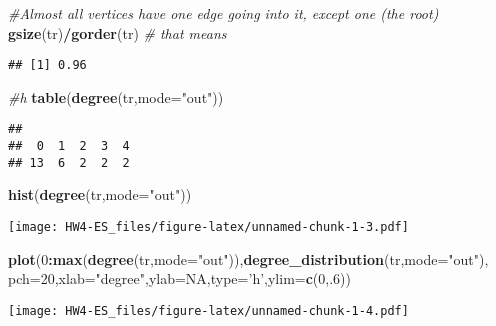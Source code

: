 \documentclass[
]{article}
\newenvironment{Shaded}{\begin{snugshade}}{\end{snugshade}}
\newcommand{\CommentTok}[1]{\textcolor[rgb]{0.56,0.35,0.01}{\textit{#1}}}
\newcommand{\DataTypeTok}[1]{\textcolor[rgb]{0.13,0.29,0.53}{#1}}
\newcommand{\DecValTok}[1]{\textcolor[rgb]{0.00,0.00,0.81}{#1}}
\newcommand{\KeywordTok}[1]{\textcolor[rgb]{0.13,0.29,0.53}{\textbf{#1}}}
\newcommand{\NormalTok}[1]{#1}
\newcommand{\OperatorTok}[1]{\textcolor[rgb]{0.81,0.36,0.00}{\textbf{#1}}}
\newcommand{\OtherTok}[1]{\textcolor[rgb]{0.56,0.35,0.01}{#1}}
\newcommand{\StringTok}[1]{\textcolor[rgb]{0.31,0.60,0.02}{#1}}
\begin{document}
\begin{Shaded}
\begin{Highlighting}[]
\CommentTok{#Almost all vertices have one edge going into it, except one (the root)}
\KeywordTok{gsize}\NormalTok{(tr)}\OperatorTok{/}\KeywordTok{gorder}\NormalTok{(tr) }\CommentTok{# that means}
\end{Highlighting}
\end{Shaded}

\begin{verbatim}
## [1] 0.96
\end{verbatim}

\begin{Shaded}
\begin{Highlighting}[]
\CommentTok{#h}
\KeywordTok{table}\NormalTok{(}\KeywordTok{degree}\NormalTok{(tr,}\DataTypeTok{mode=}\StringTok{"out"}\NormalTok{))}
\end{Highlighting}
\end{Shaded}

\begin{verbatim}
## 
##  0  1  2  3  4 
## 13  6  2  2  2
\end{verbatim}

\begin{Shaded}
\begin{Highlighting}[]
\KeywordTok{hist}\NormalTok{(}\KeywordTok{degree}\NormalTok{(tr,}\DataTypeTok{mode=}\StringTok{"out"}\NormalTok{))}
\end{Highlighting}
\end{Shaded}

\texttt{[image: HW4-ES\_files/figure-latex/unnamed-chunk-1-3.pdf]}

\begin{Shaded}
\begin{Highlighting}[]
\KeywordTok{plot}\NormalTok{(}\DecValTok{0}\OperatorTok{:}\KeywordTok{max}\NormalTok{(}\KeywordTok{degree}\NormalTok{(tr,}\DataTypeTok{mode=}\StringTok{"out"}\NormalTok{)),}\KeywordTok{degree_distribution}\NormalTok{(tr,}\DataTypeTok{mode=}\StringTok{"out"}\NormalTok{),}
     \DataTypeTok{pch=}\DecValTok{20}\NormalTok{,}\DataTypeTok{xlab=}\StringTok{"degree"}\NormalTok{,}\DataTypeTok{ylab=}\OtherTok{NA}\NormalTok{,}\DataTypeTok{type=}\StringTok{'h'}\NormalTok{,}\DataTypeTok{ylim=}\KeywordTok{c}\NormalTok{(}\DecValTok{0}\NormalTok{,.}\DecValTok{6}\NormalTok{))           }
\end{Highlighting}
\end{Shaded}

\texttt{[image: HW4-ES\_files/figure-latex/unnamed-chunk-1-4.pdf]}
\end{document}
